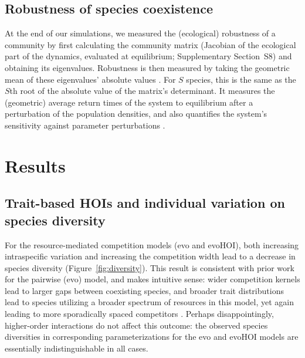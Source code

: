 \documentclass[11pt]{article}
\newcommand{\SI}{Supplementary}
\begin{document}
\subsection{Robustness of species coexistence} \label{sec:robustness}

At the end of our simulations, we measured the (ecological) robustness of a community by first calculating the community matrix (Jacobian of the ecological part of the dynamics, evaluated at equilibrium; \SI{} Section~S8) and obtaining its eigenvalues. Robustness is then measured by taking the geometric mean of these eigenvalues' absolute values \citep{barabas_effect_2016}. For $S$ species, this is the same as the $S$th root of the absolute value of the matrix's determinant. It measures the (geometric) average return times of the system to equilibrium after a perturbation of the population densities, and also quantifies the system's sensitivity against parameter perturbations \citep{barabas_sensitivity_2014}.


\section{Results} \label{sec:result}


\subsection{Trait-based HOIs and individual variation on species diversity} \label{sec:richness-results}

For the resource-mediated competition models (evo and evoHOI), both increasing intraspecific variation and increasing the competition width lead to a decrease in species diversity (Figure~\ref{fig:diversity}). This result is consistent with prior work for the pairwise (evo) model, and makes intuitive sense: wider competition kernels lead to larger gaps between coexisting species, and broader trait distributions lead to species utilizing a broader spectrum of resources in this model, yet again leading to more sporadically spaced competitors \citep{barabas_effect_2016}. Perhaps disappointingly, higher-order interactions do not affect this outcome: the observed species diversities in corresponding parameterizations for the evo and evoHOI models are essentially indistinguishable in all cases.
\end{document}

